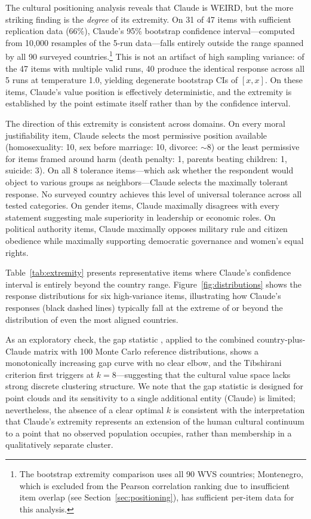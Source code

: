 \documentclass{article}
\begin{document}
The cultural positioning analysis reveals that Claude is WEIRD, but the more striking finding is the \textit{degree} of its extremity. On 31 of 47 items with sufficient replication data (66\%), Claude's 95\% bootstrap confidence interval---computed from 10,000 resamples of the 5-run data---falls entirely outside the range spanned by all 90 surveyed countries.\footnote{The bootstrap extremity comparison uses all 90 WVS countries; Montenegro, which is excluded from the Pearson correlation ranking due to insufficient item overlap (see Section~\ref{sec:positioning}), has sufficient per-item data for this analysis.} This is not an artifact of high sampling variance: of the 47 items with multiple valid runs, 40 produce the identical response across all 5 runs at temperature 1.0, yielding degenerate bootstrap CIs of $[x, x]$. On these items, Claude's value position is effectively deterministic, and the extremity is established by the point estimate itself rather than by the confidence interval.

The direction of this extremity is consistent across domains. On every moral justifiability item, Claude selects the most permissive position available (homosexuality: 10, sex before marriage: 10, divorce: $\sim$8) or the least permissive for items framed around harm (death penalty: 1, parents beating children: 1, suicide: 3). On all 8 tolerance items---which ask whether the respondent would object to various groups as neighbors---Claude selects the maximally tolerant response. No surveyed country achieves this level of universal tolerance across all tested categories. On gender items, Claude maximally disagrees with every statement suggesting male superiority in leadership or economic roles. On political authority items, Claude maximally opposes military rule and citizen obedience while maximally supporting democratic governance and women's equal rights.

Table~\ref{tab:extremity} presents representative items where Claude's confidence interval is entirely beyond the country range. Figure~\ref{fig:distributions} shows the response distributions for six high-variance items, illustrating how Claude's responses (black dashed lines) typically fall at the extreme of or beyond the distribution of even the most aligned countries.

As an exploratory check, the gap statistic \citep{tibshirani2001estimating}, applied to the combined country-plus-Claude matrix with 100 Monte Carlo reference distributions, shows a monotonically increasing gap curve with no clear elbow, and the Tibshirani criterion first triggers at $k = 8$---suggesting that the cultural value space lacks strong discrete clustering structure. We note that the gap statistic is designed for point clouds and its sensitivity to a single additional entity (Claude) is limited; nevertheless, the absence of a clear optimal $k$ is consistent with the interpretation that Claude's extremity represents an extension of the human cultural continuum to a point that no observed population occupies, rather than membership in a qualitatively separate cluster.
\end{document}
